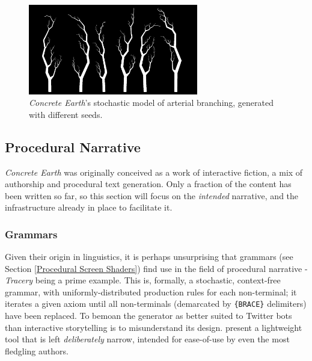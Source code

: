 \documentclass[a4paper, 11pt]{article}
\begin{document}
\begin{flushleft}
\begin{figure}[h]
\centering
\includegraphics[width=0.66\textwidth]{Blood Vessels}
\caption{\textit{Concrete Earth}'s stochastic model of arterial branching, generated with different seeds.}
\label{Blood Vessels}
\end{figure}


\subsection{Procedural Narrative} %

\textit{Concrete Earth} was originally conceived as a work of interactive fiction, a mix of authorship and procedural text generation. Only a fraction of the content has been written so far, so this section will focus on the \textit{intended} narrative, and the infrastructure already in place to facilitate it. 

\subsubsection{Grammars}

Given their origin in linguistics, it is perhaps unsurprising that grammars (see Section \ref{Procedural Screen Shaders}) find use in the field of procedural narrative - \textit{Tracery} \citep{comptonTracery} being a prime example. This is, formally, a stochastic, context-free grammar, with uniformly-distributed production rules for each non-terminal; it iterates a given axiom until all non-terminals (demarcated by \texttt{\{BRACE\}} delimiters) have been replaced. To bemoan the generator as better suited to Twitter bots than interactive storytelling is to misunderstand its design. \citeauthor{comptonTracery} present a lightweight tool that is left \textit{deliberately} narrow, intended for ease-of-use by even the most fledgling authors.


\end{flushleft}
\end{document}
